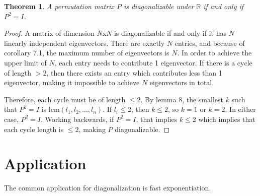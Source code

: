 \documentclass[11pt, oneside]{article}
\theoremstyle{plain}
\newtheorem{theorem}{Theorem}[section]
\theoremstyle{definition}
\begin{document}
\begin{theorem}
A permutation matrix \( P \) is diagonalizable under \( \mathbb{R} \) if and only if \( P^2 = I \).
\end{theorem}

\begin{proof}
A matrix of dimension \( N \)x\( N \) is diagonalizable if and only if it has \( N \)
linearly independent eigenvectors. There are exactly \( N \) entries,
and because of corollary 7.1, the maximum number of eigenvectors is \( N \).
In order to achieve the upper limit of \( N \), each entry needs to contribute
1 eigenvector. If there is a cycle of length \( > 2 \), then there exists an
entry which contributes less than 1 eigenvector, making it impossible to
achieve \( N \) eigenvectors in total.

Therefore, each cycle must be of length \( \leq 2 \). By lemma 8,
the smallest \( k \) such that \( P^k = I \) is \( \mathrm{lcm }(l_1, l_2, \ldots, l_n) \).
If \( l_i \leq 2 \), then \( k \leq 2 \), so \( k = 1 \) or
\( k = 2 \). In either case, \( P^2 = I \). Working backwards, if
\( P^2 = I \), that implies \( k \leq 2 \) which implies that each cycle
length is \( \leq 2 \), making \( P \) diagonalizable.
\end{proof}

\section{Application}
The common application for diagonalization is fast exponentiation.
\end{document}
